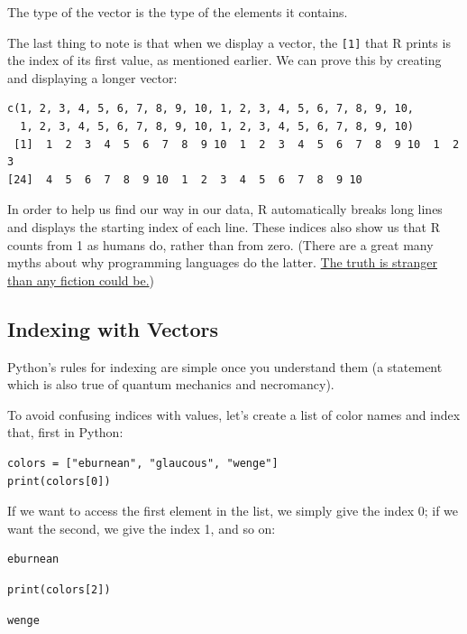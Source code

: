 The type of the vector is the type of the elements it contains.

The last thing to note is that when we display a vector,
the \texttt{[1]} that R prints is the index of its first value, as mentioned earlier.
We can prove this by creating and displaying a longer vector:

\begin{lstlisting}
c(1, 2, 3, 4, 5, 6, 7, 8, 9, 10, 1, 2, 3, 4, 5, 6, 7, 8, 9, 10,
  1, 2, 3, 4, 5, 6, 7, 8, 9, 10, 1, 2, 3, 4, 5, 6, 7, 8, 9, 10)
 [1]  1  2  3  4  5  6  7  8  9 10  1  2  3  4  5  6  7  8  9 10  1  2  3
[24]  4  5  6  7  8  9 10  1  2  3  4  5  6  7  8  9 10
\end{lstlisting}

In order to help us find our way in our data,
R automatically breaks long lines
and displays the starting index of each line.
These indices also show us that R counts from 1 as humans do,
rather than from zero.
(There are a great many myths about why programming languages do the latter.
\href{http://exple.tive.org/blarg/2013/10/22/citation-needed/}{The truth is stranger than any fiction could be.})

\subsection{Indexing with Vectors}

Python's rules for indexing are simple once you understand them
(a statement which is also true of quantum mechanics and necromancy).

To avoid confusing indices with values,
let's create a list of color names and index that, first in Python:

\begin{lstlisting}
colors = ["eburnean", "glaucous", "wenge"]
print(colors[0])
\end{lstlisting}

If we want to access the first element in the list, we simply give the index 0; if we want the second, we give the index 1, and so on:

\begin{lstlisting}
eburnean
\end{lstlisting}


\begin{lstlisting}
print(colors[2])
\end{lstlisting}

\begin{lstlisting}
wenge
\end{lstlisting}

